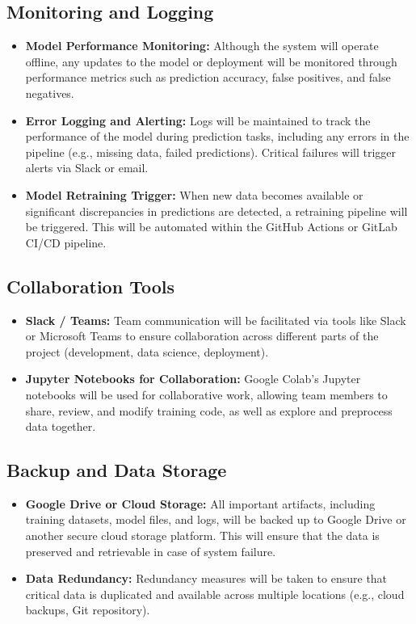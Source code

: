 \documentclass[15pt]{article}
\begin{document}
\subsection{Monitoring and Logging}
\begin{itemize}
    \item \textbf{Model Performance Monitoring:} Although the system will operate offline, any updates to the model or deployment will be monitored through performance metrics such as prediction accuracy, false positives, and false negatives.
    \item \textbf{Error Logging and Alerting:} Logs will be maintained to track the performance of the model during prediction tasks, including any errors in the pipeline (e.g., missing data, failed predictions). Critical failures will trigger alerts via Slack or email.
    \item \textbf{Model Retraining Trigger:} When new data becomes available or significant discrepancies in predictions are detected, a retraining pipeline will be triggered. This will be automated within the GitHub Actions or GitLab CI/CD pipeline.
\end{itemize}

\subsection{Collaboration Tools}
\begin{itemize}
    \item \textbf{Slack / Teams:} Team communication will be facilitated via tools like Slack or Microsoft Teams to ensure collaboration across different parts of the project (development, data science, deployment).
    \item \textbf{Jupyter Notebooks for Collaboration:} Google Colab’s Jupyter notebooks will be used for collaborative work, allowing team members to share, review, and modify training code, as well as explore and preprocess data together.
\end{itemize}

\subsection{Backup and Data Storage}
\begin{itemize}
    \item \textbf{Google Drive or Cloud Storage:} All important artifacts, including training datasets, model files, and logs, will be backed up to Google Drive or another secure cloud storage platform. This will ensure that the data is preserved and retrievable in case of system failure.
    \item \textbf{Data Redundancy:} Redundancy measures will be taken to ensure that critical data is duplicated and available across multiple locations (e.g., cloud backups, Git repository).
\end{itemize}
\end{document}
